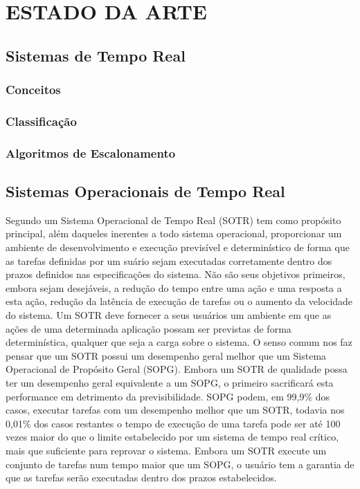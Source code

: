 \chapter{ESTADO DA ARTE}
\label{cap:estadoarte}

\section{Sistemas de Tempo Real}
\subsection{Conceitos}
\subsection{Classificação}
\subsection{Algoritmos de Escalonamento}

\section{Sistemas Operacionais de Tempo Real}
Segundo \cite{Rostedt2007} um Sistema Operacional de Tempo Real (SOTR) tem como propósito principal, além daqueles inerentes a todo sistema operacional, proporcionar um ambiente de desenvolvimento e execução previsível e determinístico de forma que as tarefas definidas por um suário sejam executadas corretamente dentro dos prazos definidos nas especificações do sistema. Não são seus objetivos primeiros, embora sejam desejáveis, a redução do tempo entre uma ação e uma resposta a esta ação, redução da latência de execução de tarefas ou o aumento da velocidade do sistema. Um SOTR deve fornecer a seus usuários um ambiente em que as ações de uma determinada aplicação possam ser previstas de forma determinística, qualquer que seja a carga sobre o sistema. O senso comum nos faz pensar que um SOTR possui um desempenho geral melhor que um Sistema Operacional de Propósito Geral (SOPG). Embora um SOTR de qualidade possa ter um desempenho geral equivalente a um SOPG, o primeiro sacrificará esta performance em detrimento da previsibilidade. SOPG podem, em 99,9\% dos casos, executar tarefas com um desempenho melhor que um SOTR, todavia nos 0,01\% dos casos restantes o tempo de execução de uma tarefa pode ser até 100 vezes maior do que o limite estabelecido por um sistema de tempo real crítico, mais que suficiente para reprovar o sistema. Embora um SOTR execute um conjunto de tarefas num tempo maior que um SOPG, o usuário tem a garantia de que as tarefas serão executadas dentro dos prazos estabelecidos.


